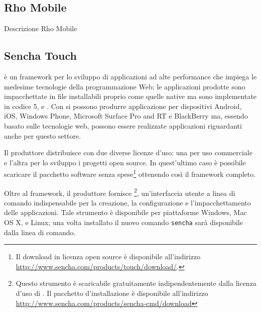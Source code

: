 		\subsection{Rho Mobile}
			Descrizione Rho Mobile

		\subsection{Sencha Touch}
			\senchat{} è un framework per lo sviluppo \crossplat{} di
			applicazioni ad	alte performance che impiega le medesime tecnologie
			della programmazione Web; le applicazioni prodotte sono
			impacchettate in file installabili proprio come quelle native ma
			sono implementate in codice \html{}5, \css{} e \js{}. Con \senchat{}
			si possono produrre applicazione per dispositivi Android, iOS,
			Windows Phone, Microsoft Surface Pro and RT e BlackBerry ma, essendo
			basato sulle tecnologie web, possono essere realizzate applicazioni
			riguardanti anche per questo settore.
			
			Il produttore distribuisce \senchat{} con due diverse licenze d'uso:
			una per uso commerciale e l'altra per lo sviluppo i progetti open 
			source. In quest'ultimo caso è possibile scaricare il pacchetto
			software senza spese\footnote{Il download in licenza open source è
			disponibile all'indirizzo \url{http://www.sencha.com/products/touch/download/}.}
			ottenendo così il framework completo.
			
			Oltre al framework, il produttore fornisce \senchacmd{}\footnote{
			Questo strumento è scaricabile gratuitamente indipendentemente dalla
			licenza d'uso di \senchat{}. Il pacchetto d'installazione è
			disponibile all'indirizzo \url{http://www.sencha.com/products/sencha-cmd/download}},
			un'interfaccia utente a linea di comando indispensabile per la
			creazione, la configurazione e l'impacchettamento delle applicazioni.
			Tale strumento è disponibile per piattaforme Windows, Mac OS X, e Linux;
			una volta installato il nuovo comando \verb|sencha| sarà disponibile
			dalla linea di comando.
			
